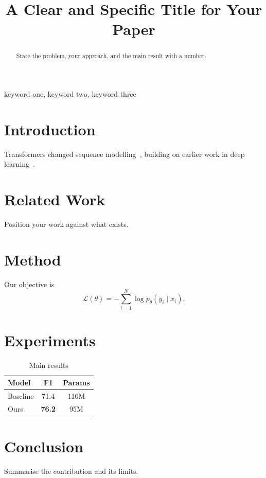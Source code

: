 \documentclass[conference]{IEEEtran}
\begin{document}
\title{A Clear and Specific Title for Your Paper}

\author{
\and
{}
}

\maketitle

\begin{abstract}
State the problem, your approach, and the main result with a number.
\end{abstract}

\begin{IEEEkeywords}
keyword one, keyword two, keyword three
\end{IEEEkeywords}

\section{Introduction}
Transformers changed sequence modelling~\cite{vaswani2017attention}, building on earlier work in deep learning~\cite{lecun2015deep}.

\section{Related Work}
Position your work against what exists.

\section{Method}
Our objective is
\begin{equation}
  \mathcal{L}(\theta) = -\sum_{i=1}^{N} \log p_\theta(y_i \mid x_i).
  \label{eq:loss}
\end{equation}

\section{Experiments}
\begin{table}[htbp]
  \caption{Main results}
  \label{tab:main}
  \centering
  \begin{tabular}{lcc}
    \toprule
    Model & F1 & Params \\
    \midrule
    Baseline & 71.4 & 110M \\
    Ours     & \textbf{76.2} & 95M \\
    \bottomrule
  \end{tabular}
\end{table}

\section{Conclusion}
Summarise the contribution and its limits.



\end{document}
